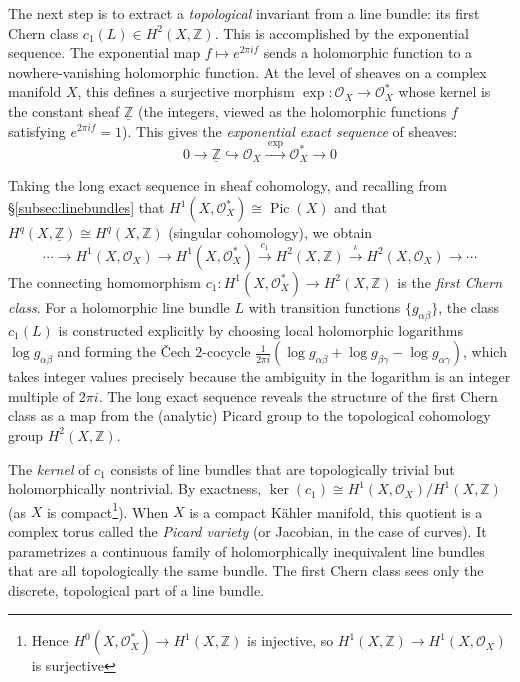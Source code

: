 \documentclass{article}
\newcommand{\Z}{{\mathbb{Z}}}
\newcommand{\CO}{\mathcal{O}}
\newcommand{\Pic}{\operatorname{Pic}}
\begin{document}
The next step is to extract a \emph{topological} invariant from a line bundle: its first Chern class $c_1(L)
\in H^2(X, \Z)$. This is accomplished by the exponential sequence. The exponential map $f \mapsto e^{2\pi i
f}$ sends a holomorphic function to a nowhere-vanishing holomorphic function. At the level of sheaves on a
complex manifold $X$, this defines a surjective morphism $\exp: \CO_X \to \CO_X^*$ whose kernel is the
constant sheaf $\underline{\Z}$ (the integers, viewed as the holomorphic functions $f$ satisfying $e^{2\pi i
f} = 1$). This gives the \emph{exponential exact sequence} of sheaves:
\[
  0 \longrightarrow \underline{\Z} \hookrightarrow
    \CO_X \xrightarrow{\;\exp\;} \CO_X^* \longrightarrow 0
\]

Taking the long exact sequence in sheaf cohomology, and recalling from
\S\ref{subsec:linebundles} that $H^1(X, \CO_X^*) \cong \Pic(X)$ and that
$H^q(X, \underline{\Z}) \cong H^q(X, \Z)$ (singular cohomology), we obtain
\begin{equation}\label{eq:longExactSeq}
  \cdots \longrightarrow H^1(X, \CO_X) \longrightarrow
    H^1(X, \CO_X^*) \xrightarrow{\;c_1\;} H^2(X, \Z)
    \xrightarrow{\;\iota\;} H^2(X, \CO_X) \longrightarrow \cdots
\end{equation}
The connecting homomorphism $c_1: H^1(X, \CO_X^*) \to H^2(X, \Z)$ is the \emph{first Chern class}. For a
holomorphic line bundle $L$ with transition functions $\{g_{\alpha\beta}\}$, the class $c_1(L)$ is constructed
explicitly by choosing local holomorphic logarithms $\log g_{\alpha\beta}$ and forming the \v{C}ech
$2$-cocycle $\frac{1}{2\pi i}(\log g_{\alpha\beta} + \log g_{\beta\gamma} - \log g_{\alpha\gamma})$, which
takes integer values precisely because the ambiguity in the logarithm is an integer multiple of $2\pi i$. The
long exact sequence reveals the structure of the first Chern class as a map from the (analytic) Picard group to
the topological cohomology group $H^2(X, \Z)$.

The \emph{kernel} of $c_1$ consists of line bundles that are topologically trivial but holomorphically
nontrivial. By exactness, $\ker(c_1) \cong H^1(X, \CO_X) / H^1(X, \Z)$ (as $X$ is compact\footnote{Hence $
  H^0(X, \mathcal{O}_X^*) \to H^1(X, \mathbb{Z})$ is injective, so $H^1(X, \mathbb{Z}) \to H^1(X,
\mathcal{O}_X)$ is surjective}). When $X$ is a compact K\"{a}hler manifold, this quotient is a complex torus
called the \emph{Picard variety} (or Jacobian, in the case of curves). It parametrizes a continuous family of
holomorphically inequivalent line bundles that are all topologically the same bundle. The first Chern class
sees only the discrete, topological part of a line bundle.
\end{document}
